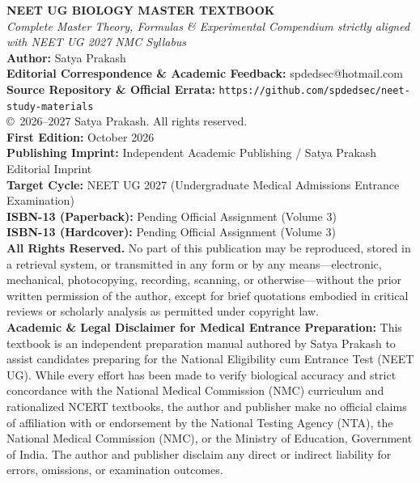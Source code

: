 \documentclass[10pt,twoside,openright]{book}
\begin{document}
\thispagestyle{empty}
\vspace*{\fill}
\begin{flushleft}
{\small
\textbf{NEET UG BIOLOGY MASTER TEXTBOOK}\\[2pt]
\textit{Complete Master Theory, Formulas \& Experimental Compendium strictly aligned with NEET UG 2027 NMC Syllabus}\\[8pt]
\textbf{Author:} Satya Prakash\\
\textbf{Editorial Correspondence \& Academic Feedback:} spdedsec@hotmail.com\\
\textbf{Source Repository \& Official Errata:} \nolinkurl{https://github.com/spdedsec/neet-study-materials}\\[10pt]

\copyright\ 2026--2027 Satya Prakash. All rights reserved.\\[8pt]

\textbf{First Edition:} October 2026\\
\textbf{Publishing Imprint:} Independent Academic Publishing / Satya Prakash Editorial Imprint\\
\textbf{Target Cycle:} NEET UG 2027 (Undergraduate Medical Admissions Entrance Examination)\\
\textbf{ISBN-13 (Paperback):} Pending Official Assignment (Volume 3)\\
\textbf{ISBN-13 (Hardcover):} Pending Official Assignment (Volume 3)\\[10pt]

\textbf{All Rights Reserved.} No part of this publication may be reproduced, stored in a retrieval system, or transmitted in any form or by any means---electronic, mechanical, photocopying, recording, scanning, or otherwise---without the prior written permission of the author, except for brief quotations embodied in critical reviews or scholarly analysis as permitted under copyright law.\\[8pt]

\textbf{Academic \& Legal Disclaimer for Medical Entrance Preparation:} This textbook is an independent preparation manual authored by Satya Prakash to assist candidates preparing for the National Eligibility cum Entrance Test (NEET UG). While every effort has been made to verify biological accuracy and strict concordance with the National Medical Commission (NMC) curriculum and rationalized NCERT textbooks, the author and publisher make no official claims of affiliation with or endorsement by the National Testing Agency (NTA), the National Medical Commission (NMC), or the Ministry of Education, Government of India. The author and publisher disclaim any direct or indirect liability for errors, omissions, or examination outcomes.\\[8pt]

}
\end{flushleft}
\end{document}
